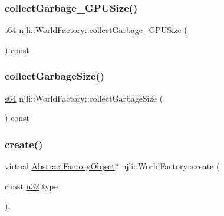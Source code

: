 \subsubsection{\texorpdfstring{collect\+Garbage\+\_\+\+G\+P\+U\+Size()}{collectGarbage\_GPUSize()}}
{\footnotesize\ttfamily \mbox{\hyperlink{_util_8h_a4258bfb2c3a440d06c4aaa3c2b450dde}{s64}} njli\+::\+World\+Factory\+::collect\+Garbage\+\_\+\+G\+P\+U\+Size (\begin{DoxyParamCaption}{ }\end{DoxyParamCaption}) const}

\mbox{\label{classnjli_1_1_world_factory_a3c8e3ff7af8014d3b52483251bc0661e}} 
\subsubsection{\texorpdfstring{collect\+Garbage\+Size()}{collectGarbageSize()}}
{\footnotesize\ttfamily \mbox{\hyperlink{_util_8h_a4258bfb2c3a440d06c4aaa3c2b450dde}{s64}} njli\+::\+World\+Factory\+::collect\+Garbage\+Size (\begin{DoxyParamCaption}{ }\end{DoxyParamCaption}) const}

\mbox{\label{classnjli_1_1_world_factory_a750b2aa5e4b856d72c629f381e671166}} 
\subsubsection{\texorpdfstring{create()}{create()}\hspace{0.1cm}{\footnotesize\ttfamily [1/2]}}
{\footnotesize\ttfamily virtual \mbox{\hyperlink{classnjli_1_1_abstract_factory_object}{Abstract\+Factory\+Object}}$\ast$ njli\+::\+World\+Factory\+::create (\begin{DoxyParamCaption}\item[{const \mbox{\hyperlink{_util_8h_a10e94b422ef0c20dcdec20d31a1f5049}{u32}}}]{type }\end{DoxyParamCaption})\hspace{0.3cm}{\ttfamily [protected]}, {\ttfamily [virtual]}}

